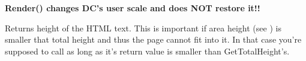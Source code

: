{\bf Render() changes DC's user scale and does NOT restore it!!}



\label{wxhtmldcrenderergettotalheight}


Returns height of the HTML text. This is important if area height (see )
is smaller that total height and thus the page cannot fit into it. In that case you're supposed to
call  as long as it's return value is smaller than GetTotalHeight's.




